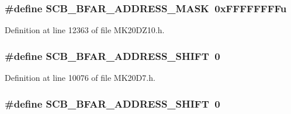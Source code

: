 \subsubsection[{\texorpdfstring{S\+C\+B\+\_\+\+B\+F\+A\+R\+\_\+\+A\+D\+D\+R\+E\+S\+S\+\_\+\+M\+A\+SK}{SCB_BFAR_ADDRESS_MASK}}]{\setlength{\rightskip}{0pt plus 5cm}\#define S\+C\+B\+\_\+\+B\+F\+A\+R\+\_\+\+A\+D\+D\+R\+E\+S\+S\+\_\+\+M\+A\+SK~0x\+F\+F\+F\+F\+F\+F\+F\+Fu}\hypertarget{group___s_c_b___register___masks_ga06dcfef31b1e1581acbd10898ff4518b}{}\label{group___s_c_b___register___masks_ga06dcfef31b1e1581acbd10898ff4518b}


Definition at line 12363 of file M\+K20\+D\+Z10.\+h.

\subsubsection[{\texorpdfstring{S\+C\+B\+\_\+\+B\+F\+A\+R\+\_\+\+A\+D\+D\+R\+E\+S\+S\+\_\+\+S\+H\+I\+FT}{SCB_BFAR_ADDRESS_SHIFT}}]{\setlength{\rightskip}{0pt plus 5cm}\#define S\+C\+B\+\_\+\+B\+F\+A\+R\+\_\+\+A\+D\+D\+R\+E\+S\+S\+\_\+\+S\+H\+I\+FT~0}\hypertarget{group___s_c_b___register___masks_ga31b33596b81d9fc88c64157b518bd434}{}\label{group___s_c_b___register___masks_ga31b33596b81d9fc88c64157b518bd434}


Definition at line 10076 of file M\+K20\+D7.\+h.

\subsubsection[{\texorpdfstring{S\+C\+B\+\_\+\+B\+F\+A\+R\+\_\+\+A\+D\+D\+R\+E\+S\+S\+\_\+\+S\+H\+I\+FT}{SCB_BFAR_ADDRESS_SHIFT}}]{\setlength{\rightskip}{0pt plus 5cm}\#define S\+C\+B\+\_\+\+B\+F\+A\+R\+\_\+\+A\+D\+D\+R\+E\+S\+S\+\_\+\+S\+H\+I\+FT~0}\hypertarget{group___s_c_b___register___masks_ga31b33596b81d9fc88c64157b518bd434}{}\label{group___s_c_b___register___masks_ga31b33596b81d9fc88c64157b518bd434}


